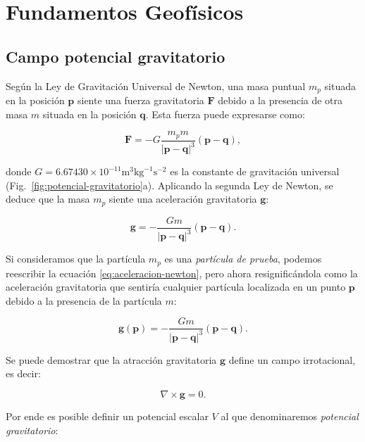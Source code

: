 \chapter{Fundamentos Geofísicos}
\label{cha:fundamentos}

\section{Campo potencial gravitatorio}

Según la Ley de Gravitación Universal de Newton, una masa puntual $m_p$ situada
en la posición $\mathbf{p}$ siente una fuerza gravitatoria $\mathbf{F}$ debido
a la presencia de otra masa $m$ situada en la posición $\mathbf{q}$. Esta
fuerza puede expresarse como:

\begin{equation}
    \mathbf{F} =
        - G \frac{m_p m}{|\mathbf{p} - \mathbf{q}|^3} (\mathbf{p} - \mathbf{q}),
\end{equation}

\noindent donde $G = 6.67430 \times 10^{-11} \text{m}^3 \text{kg}^{-1}
\text{s}^{-2}$ es la constante de gravitación universal
(Fig.~\ref{fig:potencial-gravitatorio}a).
Aplicando la segunda Ley de Newton, se deduce que la masa $m_p$ siente una
aceleración gravitatoria $\mathbf{g}$:

\begin{equation}
    \mathbf{g} =
        - \frac{G m}{|\mathbf{p} - \mathbf{q}|^3} (\mathbf{p} - \mathbf{q}).
    \label{eq:aceleracion-newton}
\end{equation}

Si consideramos que la partícula $m_p$ es una \emph{partícula de prueba},
podemos reescribir la ecuación \ref{eq:aceleracion-newton}, pero ahora
resignificándola como la aceleración gravitatoria que sentiría cualquier
partícula localizada en un punto $\mathbf{p}$ debido a la presencia de la
partícula $m$:

\begin{equation}
    \mathbf{g}(\mathbf{p}) =
        - \frac{G m}{|\mathbf{p} - \mathbf{q}|^3} (\mathbf{p} - \mathbf{q}).
\end{equation}

Se puede demostrar que la atracción gravitatoria $\mathbf{g}$ define un campo
irrotacional, es decir:

\begin{equation}
    \nabla \times \mathbf{g} = 0.
\end{equation}

\noindent Por ende es posible definir un potencial escalar $V$ al que
denominaremos \emph{potencial gravitatorio}:

